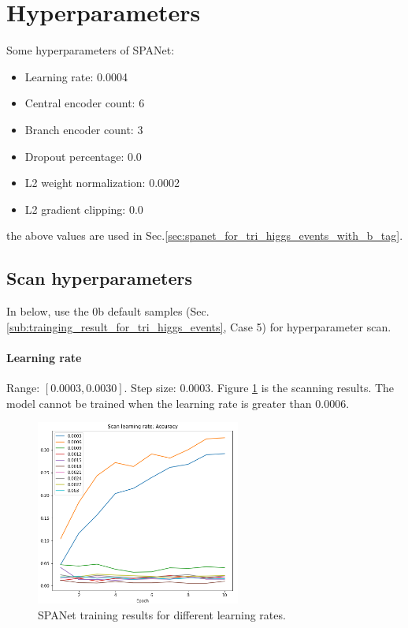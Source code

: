 \documentclass[12pt]{article}
\begin{document}
\section{Hyperparameters}%
\label{sec:hyperparameters}
	Some hyperparameters of SPANet:
	\begin{itemize}
		\item Learning rate: 0.0004
		\item Central encoder count: 6
		\item Branch encoder count: 3
		\item Dropout percentage: 0.0
		\item L2 weight normalization: 0.0002
		\item L2 gradient clipping: 0.0
	\end{itemize}
	the above values are used in Sec.\ref{sec:spanet_for_tri_higgs_events_with_b_tag}.
	\subsection{Scan hyperparameters}%
	\label{sub:scan_hyperparameters}
		In below, use the 0b default samples (Sec.\ref{sub:trainging_result_for_tri_higgs_events}, Case 5) for hyperparameter scan.

		\paragraph{Learning rate} Range: $[0.0003,  0.0030]$. Step size: $0.0003$. Figure \ref{fig:SPANet_scan_lr} is the scanning results. The model cannot be trained when the learning rate is greater than 0.0006.
		\begin{figure}[htpb]
			\centering
			\includegraphics[width=0.6\textwidth]{accuracy_curve_hp_scan_lr.png}
			\caption{SPANet training results for different learning rates.}
			\label{fig:SPANet_scan_lr}
		\end{figure}
\end{document}
